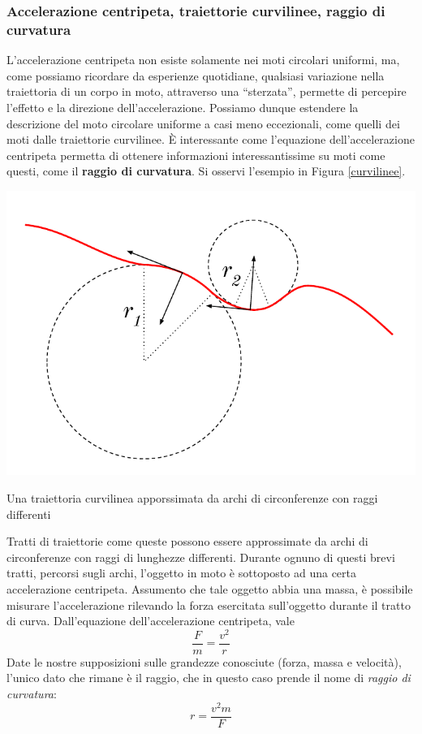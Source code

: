 \subsubsection*{Accelerazione centripeta, traiettorie curvilinee, raggio di curvatura}
L'accelerazione centripeta non esiste solamente nei moti circolari uniformi,
ma, come possiamo ricordare da esperienze quotidiane, qualsiasi variazione
nella traiettoria di un corpo in moto, attraverso una ``sterzata'', permette
di percepire l'effetto e la direzione dell'accelerazione.
Possiamo dunque estendere la descrizione del moto circolare uniforme a casi
meno eccezionali, come quelli dei moti dalle traiettorie curvilinee. È interessante
come l'equazione dell'accelerazione centripeta permetta di ottenere informazioni
interessantissime su moti come questi, come il \textbf{raggio di curvatura}. Si
osservi l'esempio in Figura \ref{curvilinee}.
\begin{marginfigure}
    \centering
    \includegraphics[width = \marginparwidth]{figures/curvilinee.pdf}
    \caption{Una traiettoria curvilinea apporssimata da archi di circonferenze con raggi differenti}
    \label{curvilinee}
\end{marginfigure}
Tratti di traiettorie come queste possono essere approssimate da archi di
circonferenze con raggi di lunghezze differenti. Durante ognuno di questi brevi
tratti, percorsi sugli archi, l'oggetto in moto è sottoposto ad una certa
accelerazione centripeta. Assumento che tale oggetto abbia una massa, è
possibile misurare l'accelerazione rilevando la forza esercitata sull'oggetto
durante il tratto di curva. Dall'equazione dell'accelerazione centripeta,
vale
\[\frac{F}{m} = \frac{v^2}{r}\]
Date le nostre supposizioni sulle grandezze conosciute (forza, massa e velocità), l'unico
dato che rimane è il raggio, che in questo caso prende il nome di
\textit{raggio di curvatura}:
\[ r = \frac{v^2m}{F} \]

